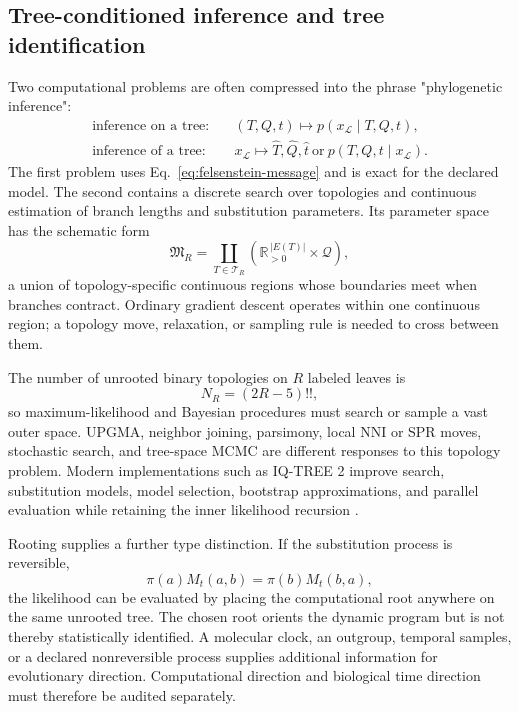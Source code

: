 \documentclass[10pt]{article}
\theoremstyle{definition}
\theoremstyle{remark}
\newcommand{\BookSection}[1]{\subsection{#1}}
\begin{document}
\BookSection{Tree-conditioned inference and tree identification}

Two computational problems are often compressed into the phrase "phylogenetic inference":
\begin{equation}
\boxed{
\begin{aligned}
\text{inference on a tree:}&\quad
(T,Q,t)\longmapsto p(x_{\mathcal L}\mid T,Q,t),\\
\text{inference of a tree:}&\quad
x_{\mathcal L}\longmapsto
\widehat T,\widehat Q,\widehat t
\ \text{or}\ p(T,Q,t\mid x_{\mathcal L}).
\end{aligned}}
\label{eq:on-tree-versus-of-tree}
\end{equation}
The first problem uses Eq.~\ref{eq:felsenstein-message} and is exact for the declared model.  The
second contains a discrete search over topologies and continuous estimation of branch lengths and
substitution parameters.  Its parameter space has the schematic form
\begin{equation}
\mathfrak M_R
=\coprod_{T\in\mathcal T_R}
\left(
\mathbb R_{>0}^{\,|E(T)|}\times\mathcal Q
\right),
\label{eq:phylogenetic-model-space}
\end{equation}
a union of topology-specific continuous regions whose boundaries meet when branches contract.
Ordinary gradient descent operates within one continuous region; a topology move, relaxation, or
sampling rule is needed to cross between them.

The number of unrooted binary topologies on $R$ labeled leaves is
\begin{equation}
N_R=(2R-5)!!,
\label{eq:number-unrooted-trees}
\end{equation}
so maximum-likelihood and Bayesian procedures must search or sample a vast outer space.  UPGMA,
neighbor joining, parsimony, local NNI or SPR moves, stochastic search, and tree-space MCMC are
different responses to this topology problem.  Modern implementations such as IQ-TREE 2 improve
search, substitution models, model selection, bootstrap approximations, and parallel evaluation
while retaining the inner likelihood recursion \cite{saitou1987,minh2020iqtree}.

Rooting supplies a further type distinction.  If the substitution process is reversible,
\begin{equation}
\pi(a)M_t(a,b)=\pi(b)M_t(b,a),
\label{eq:phylo-detailed-balance}
\end{equation}
the likelihood can be evaluated by placing the computational root anywhere on the same unrooted
tree.  The chosen root orients the dynamic program but is not thereby statistically identified.
A molecular clock, an outgroup, temporal samples, or a declared nonreversible process supplies
additional information for evolutionary direction.  Computational direction and biological time
direction must therefore be audited separately.
\end{document}

